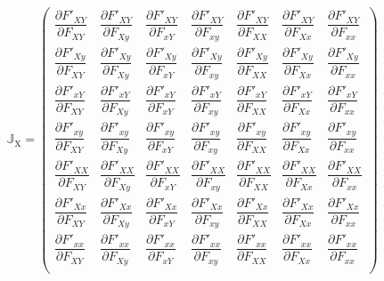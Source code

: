 \documentclass{article}
\begin{document}
\begin{equation}
	\mathbb{J}_{\text{X}} = \left( \begin{array}{ccccccc} 
		\dfrac{\partial  F'_{XY}}{\partial F_{XY}} & \dfrac{\partial  F'_{XY}}{\partial F_{Xy}} & \dfrac{\partial  F'_{XY}}{\partial F_{xY}} & \dfrac{\partial  F'_{XY}}{\partial F_{xy}} & \dfrac{\partial  F'_{XY}}{\partial F_{XX}} & \dfrac{\partial  F'_{XY}}{\partial F_{Xx}} & \dfrac{\partial  F'_{XY}}{\partial F_{xx}} \\ 
		\dfrac{\partial  F'_{Xy}}{\partial F_{XY}} & \dfrac{\partial  F'_{Xy}}{\partial F_{Xy}} & \dfrac{\partial  F'_{Xy}}{\partial F_{xY}} & \dfrac{\partial  F'_{Xy}}{\partial F_{xy}} & \dfrac{\partial  F'_{Xy}}{\partial F_{XX}} & \dfrac{\partial  F'_{Xy}}{\partial F_{Xx}} & \dfrac{\partial  F'_{Xy}}{\partial F_{xx}} \\ 
		\dfrac{\partial  F'_{xY}}{\partial F_{XY}} & \dfrac{\partial  F'_{xY}}{\partial F_{Xy}} & \dfrac{\partial  F'_{xY}}{\partial F_{xY}} & \dfrac{\partial  F'_{xY}}{\partial F_{xy}} & \dfrac{\partial  F'_{xY}}{\partial F_{XX}} & \dfrac{\partial  F'_{xY}}{\partial F_{Xx}} & \dfrac{\partial  F'_{xY}}{\partial F_{xx}} \\ 
		\dfrac{\partial  F'_{xy}}{\partial F_{XY}} & \dfrac{\partial  F'_{xy}}{\partial F_{Xy}} & \dfrac{\partial  F'_{xy}}{\partial F_{xY}} & \dfrac{\partial  F'_{xy}}{\partial F_{xy}} & \dfrac{\partial  F'_{xy}}{\partial F_{XX}} & \dfrac{\partial  F'_{xy}}{\partial F_{Xx}} & \dfrac{\partial  F'_{xy}}{\partial F_{xx}} \\ 
		\dfrac{\partial  F'_{XX}}{\partial F_{XY}} & \dfrac{\partial  F'_{XX}}{\partial F_{Xy}} & \dfrac{\partial  F'_{XX}}{\partial F_{xY}} & \dfrac{\partial  F'_{XX}}{\partial F_{xy}} & \dfrac{\partial  F'_{XX}}{\partial F_{XX}} & \dfrac{\partial  F'_{XX}}{\partial F_{Xx}} & \dfrac{\partial  F'_{XX}}{\partial F_{xx}} \\ 
		\dfrac{\partial  F'_{Xx}}{\partial F_{XY}} & \dfrac{\partial  F'_{Xx}}{\partial F_{Xy}} & \dfrac{\partial  F'_{Xx}}{\partial F_{xY}} & \dfrac{\partial  F'_{Xx}}{\partial F_{xy}} & \dfrac{\partial  F'_{Xx}}{\partial F_{XX}} & \dfrac{\partial  F'_{Xx}}{\partial F_{Xx}} & \dfrac{\partial  F'_{Xx}}{\partial F_{xx}} \\ 
		\dfrac{\partial  F'_{xx}}{\partial F_{XY}} & \dfrac{\partial  F'_{xx}}{\partial F_{Xy}} & \dfrac{\partial  F'_{xx}}{\partial F_{xY}} & \dfrac{\partial  F'_{xx}}{\partial F_{xy}} & \dfrac{\partial  F'_{xx}}{\partial F_{XX}} & \dfrac{\partial  F'_{xx}}{\partial F_{Xx}} & \dfrac{\partial  F'_{xx}}{\partial F_{xx}} \\ 
	\end{array} \right)
\end{equation}
\end{document}
